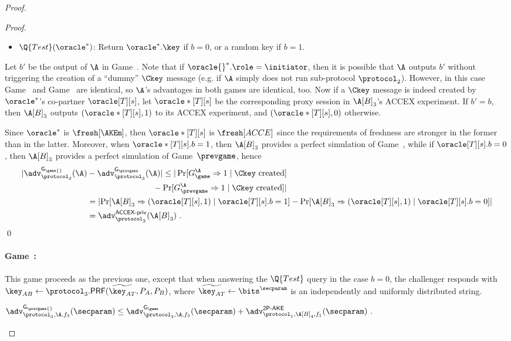 \begin{proof}
\begin{proof}
\begin{itemize}
	\item $\Q{Test}(\oracle^*)$: 
	Return $\oracle^*.\key$ if $b=0$,
	or a random key if $b = 1$.
		
\end{itemize}
Let $b'$ be the output of $\A$ in Game~\game{}.
Note that if $\oracle{}^*.\role = \initiator$,
then it is possible that $\A$ outputs $b'$ without triggering the creation of a ``dummy'' $\Ckey$ message
(e.g. if $\A$ simply does not run sub-protocol $\protocol_2$).
However,
in this case Game~\prevgame{} and Game~\game{} are identical,
so $\A$'s advantages in both games are identical, too.
Now if a $\Ckey$ message is indeed created by $\oracle^*$'s co-partner $\oracle[T][s]$,
let $\oracle*[T][s]$ be the corresponding proxy session in $\A[B]_3$'s ACCEX experiment.
If $b' = b$, 
then $\A[B]_3$ outputs $(\oracle*[T][s], 1)$ to its ACCEX experiment,
and $(\oracle*[T][s], 0)$ otherwise.

Since $\oracle^*$ is $\fresh[\AKEm]$,
then $\oracle*[T][s]$ is $\fresh[ACCE]$ since the requirements of freshness are stronger in the former than in the latter.
Moreover,
when $\oracle*[T][s].b = 1$, 
then $\A[B]_3$ provides a perfect simulation of Game~\game{},
while if $\oracle[T][s].b = 0$,
then $\A[B]_3$ provides a perfect simulation of Game~$\prevgame$,
hence
\begin{align}
	| \adv_{\protocol_3}^{\mathsf{G_{\game{}}}}(\A)
		&- \adv_{\protocol_3}^{\mathsf{G_{\prevgame}}}(\A)  | 
	 \leq | \Pr[G_{\game}^{\A} \Rightarrow 1 \mid \Ckey \text{ created}] \\
		&\qquad\qquad\qquad\qquad - \Pr[G_{\prevgame}^{\A} \Rightarrow 1 \mid \Ckey \text{ created}] | \\ 
	 &= \left| \Pr[\A[B]_3 \Rightarrow (\oracle[T][s],1) \mid \oracle[T][s].b = 1] 
		 - \Pr[\A[B]_3 \Rightarrow (\oracle[T][s],1) \mid \oracle[T][s].b = 0] \right| \\
	 &= \adv_{\protocol_2}^{\operatorname{\mathsf{ACCEX-priv}}}(\A[B]_3) \ .
\end{align}\qed
\end{proof} 
\fi

\newgame
\paragraph{Game~\game:}
This game proceeds as the previous one,
except that when answering the $\Q{Test}$ query in the case $b = 0$,
the challenger responds with $\key_{AB} \gets \protocol_3.\mathsf{PRF}(\widetilde{\key_{AT}},P_A, P_B)$,
where $\widetilde{\key_{AT}} \gets \bits^\secparam$ is an independently and uniformly distributed string.
\begin{lemma}\label{lemma:3P-KD:2P-AKE-swap-random}
$
	\adv_{\protocol_3,\A,f_3}^{\mathsf{G_{\prevgame{}}}}(\secparam) 
	\leq \adv_{\protocol_3,\A,f_3}^{\mathsf{G_\game}}(\secparam) 
	+ \adv_{\protocol_1,\A[B]_4, f_1}^{\operatorname{\mathsf{2P-AKE}}}(\secparam) \ .
$
\end{lemma}


\end{proof}
